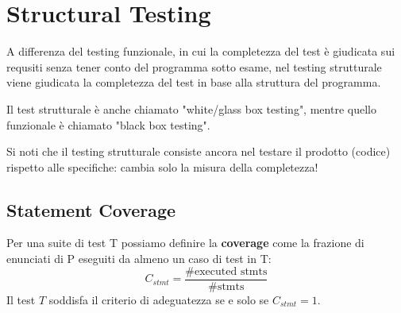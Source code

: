 
\section{Structural Testing}
A differenza del testing funzionale, in cui la completezza del test è giudicata sui requsiti senza tener conto del programma sotto esame,
nel testing strutturale viene giudicata la completezza del test in base alla struttura del programma.

Il test strutturale è anche chiamato "white/glass box testing", mentre quello funzionale è chiamato "black box testing".

Si noti che il testing strutturale consiste ancora nel testare il prodotto (codice) rispetto alle specifiche: cambia solo la misura della completezza!


\subsection{Statement Coverage}
Per una suite di test T possiamo definire la \textbf{coverage} come la frazione di enunciati di P eseguiti da almeno un caso di test in T:
\[ C_{stmt} = \frac{\text{\# executed stmts}}{\text{\# stmts}} \]
Il test $T$ soddisfa il criterio di adeguatezza se e solo se $C_{stmt} = 1$.

